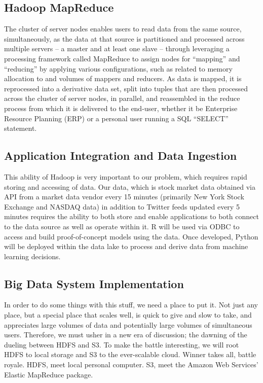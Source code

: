 \documentclass[journal]{IEEEtran}
\begin{document}
\subsection{Hadoop MapReduce}
The cluster of server nodes enables users to read data from the same source, simultaneously, as the data at that source is partitioned and processed across multiple servers – a master and at least one slave – through leveraging a processing framework called MapReduce to assign nodes for ``mapping'' and ``reducing'' by applying various configurations, such as related to memory allocation to and volumes of mappers and reducers. As data is mapped, it is reprocessed into a derivative data set, split into tuples that are then processed across the cluster of server nodes, in parallel, and reassembled in the reduce process from which it is delivered to the end-user, whether it be Enterprise Resource Planning (ERP) or a personal user running a SQL “SELECT” statement.

\subsection{Application Integration and Data Ingestion}
This ability of Hadoop is very important to our problem, which requires rapid storing and accessing of data. Our data, which is stock market data obtained via API from a market data vendor every 15 minutes (primarily New York Stock Exchange and NASDAQ data) in addition to Twitter feeds updated every 5 minutes requires the ability to both store and enable applications to both connect to the data source as well as operate within it. R will be used via ODBC to access and build proof-of-concept models using the data. Once developed, Python will be deployed within the data lake to process and derive data from machine learning decisions.

\subsection{Big Data System Implementation}
In order to do some things with this stuff, we need a place to put it. Not just any place, but a special place that scales well, is quick to give and slow to take, and appreciates large volumes of data and potentially large volumes of simultaneous users. Therefore, we must usher in a new era of discussion; the dawning of the dueling between HDFS and S3. To make the battle interesting, we will root HDFS to local storage and S3 to the ever-scalable cloud. Winner takes all, battle royale. HDFS, meet local personal computer. S3, meet the Amazon Web Services' Elastic MapReduce package.
\end{document}
